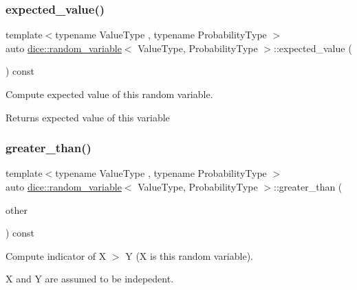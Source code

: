 \subsubsection{\texorpdfstring{expected\+\_\+value()}{expected\_value()}}
{\footnotesize\ttfamily template$<$typename Value\+Type , typename Probability\+Type $>$ \\
auto \mbox{\hyperlink{classdice_1_1random__variable}{dice\+::random\+\_\+variable}}$<$ Value\+Type, Probability\+Type $>$\+::expected\+\_\+value (\begin{DoxyParamCaption}{ }\end{DoxyParamCaption}) const\hspace{0.3cm}{\ttfamily [inline]}}



Compute expected value of this random variable. 

\begin{DoxyReturn}{Returns}
expected value of this variable 
\end{DoxyReturn}
\mbox{\label{classdice_1_1random__variable_abeb43cf9343eb0f26418b71f04a3b350}} 
\subsubsection{\texorpdfstring{greater\+\_\+than()}{greater\_than()}}
{\footnotesize\ttfamily template$<$typename Value\+Type , typename Probability\+Type $>$ \\
auto \mbox{\hyperlink{classdice_1_1random__variable}{dice\+::random\+\_\+variable}}$<$ Value\+Type, Probability\+Type $>$\+::greater\+\_\+than (\begin{DoxyParamCaption}\item[{const \mbox{\hyperlink{classdice_1_1random__variable}{random\+\_\+variable}}$<$ Value\+Type, Probability\+Type $>$ \&}]{other }\end{DoxyParamCaption}) const\hspace{0.3cm}{\ttfamily [inline]}}



Compute indicator of X $>$ Y (X is this random variable). 

X and Y are assumed to be indepedent.



